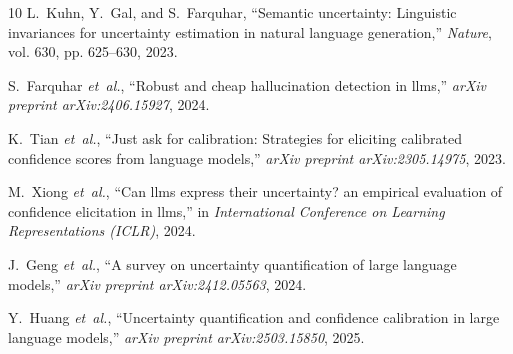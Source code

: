\documentclass[journal]{IEEEtran}
\begin{document}
\begin{thebibliography}{10}
L.~Kuhn, Y.~Gal, and S.~Farquhar, ``Semantic uncertainty: Linguistic
  invariances for uncertainty estimation in natural language generation,''
  \emph{Nature}, vol. 630, pp. 625--630, 2023.

S.~Farquhar \emph{et~al.}, ``Robust and cheap hallucination detection in
  llms,'' \emph{arXiv preprint arXiv:2406.15927}, 2024.

K.~Tian \emph{et~al.}, ``Just ask for calibration: Strategies for eliciting
  calibrated confidence scores from language models,'' \emph{arXiv preprint
  arXiv:2305.14975}, 2023.

M.~Xiong \emph{et~al.}, ``Can llms express their uncertainty? an empirical
  evaluation of confidence elicitation in llms,'' in \emph{International
  Conference on Learning Representations (ICLR)}, 2024.

J.~Geng \emph{et~al.}, ``A survey on uncertainty quantification of large
  language models,'' \emph{arXiv preprint arXiv:2412.05563}, 2024.

Y.~Huang \emph{et~al.}, ``Uncertainty quantification and confidence calibration
  in large language models,'' \emph{arXiv preprint arXiv:2503.15850}, 2025.

\end{thebibliography}
\end{document}
